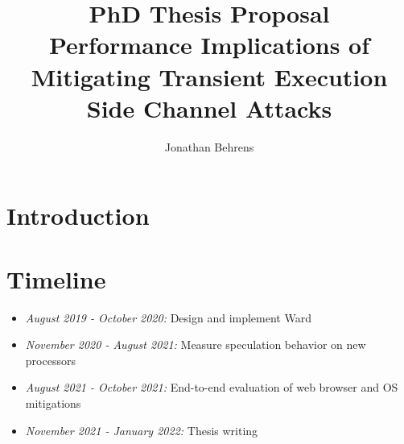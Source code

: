 \documentclass[letterpaper,12pt]{article}
\begin{document}

\date{\vspace{-\baselineskip}}
\title{\bf PhD Thesis Proposal \\ \large Performance Implications of Mitigating Transient Execution Side Channel Attacks}
\author{ {\rm Jonathan Behrens} }
\maketitle

\section{Introduction}


\section{Timeline}
\begin{itemize}
\item\textit{August 2019 - October 2020:} Design and implement Ward
\item\textit{November 2020 - August 2021:} Measure speculation behavior on new processors
\item\textit{August 2021 - October 2021:} End-to-end evaluation of web browser and OS mitigations
\item\textit{November 2021 - January 2022:} Thesis writing
\end{itemize}

\pagebreak
{}

\end{document}

